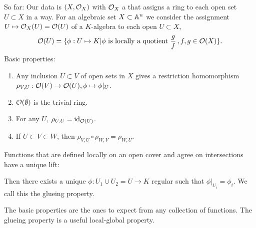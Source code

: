\documentclass[a4paper,11pt]{article}
\begin{document}
			\noindent So far: Our data is $(X,\O_X)$ with $\O_X$ a  that assigns a ring to each open set $U\subset X$ in a  way. For an algebraic set $X\subset\AA^n$ we consider the assignment $U\mapsto\O_X(U)=\O(U)$ of a $K$-algebra to each open $U\subset X$, 
			\begin{equation*}
				\O(U)=\{\phi:U\mapsto K|\phi\text{ is locally a quotient }\frac{g}{f}\,,f,g\in\O(X)\}.
			\end{equation*}
			Basic properties:
			\begin{enumerate}
				\item Any inclusion $U\subset V$ of open sets in $X$ gives a restriction homomorphism $\rho_{V,U}:\O(V)\rightarrow\O(U),\phi\mapsto\phi|_U$.
				\item $\O(\emptyset)$ is the trivial ring.
				\item For any $U$, $\rho_{U,U}=\id_{\O(U)}$.
				\item If $U\subset V\subset W$, then $\rho_{V,U}\circ\rho_{W,V}=\rho_{W,U}$.
			\end{enumerate}
			Functions that are defined locally on an open cover and agree on intersections have a unique lift: 
			
			\def\firstcircle{ (0.0, 0.0) circle (1.5)}
			\def\secondcircle{(2.0, 0.0) circle (1.5)}
			\begin{center}
			\end{center}
			
			\noindent Then there exists a unique $\phi:U_1\cup U_2=U\rightarrow K$ regular such that $\phi|_{U_i}=\phi_i$. We call this the glueing property.

			\begin{remark}
				The basic properties are the ones to expect from any collection of functions. The glueing property is a useful local-global property. 
			\end{remark}
\end{document}
